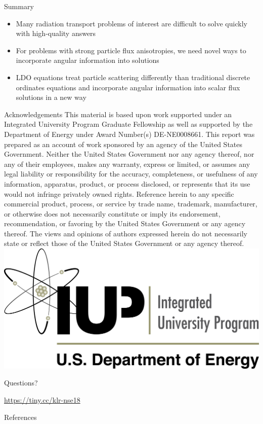 \documentclass{beamer}
\newcommand{\backupbegin}{
   \newcounter{framenumberappendix}
   \setcounter{framenumberappendix}{\value{framenumber}}
}
\newcommand{\backupend}{
   \addtocounter{framenumberappendix}{-\value{framenumber}}
   \addtocounter{framenumber}{\value{framenumberappendix}} 
}
\begin{document}
\begin{frame}{Summary}
%
\begin{itemize}
\item{Many radiation transport problems of interest are difficult to solve quickly with 
      high-quality answers}
\item{For problems with strong particle flux anisotropies, we need novel ways to incorporate
      angular information into solutions}
\item{LDO equations treat particle scattering differently than traditional discrete ordinates
      equations and incorporate angular information into scalar flux solutions in a new way}
\end{itemize}
%
\end{frame}

\begin{frame}{Acknowledgements}
\scriptsize
This material is based upon work supported under an Integrated
University Program Graduate Fellowship as well as supported by the Department 
of Energy under Award Number(s) DE-NE0008661. This report was prepared as an account 
of work sponsored by an agency of the United States Government. Neither the United 
States Government nor any agency thereof, nor any of their employees, makes any 
warranty, express or limited, or assumes any legal liability or responsibility for the 
accuracy, completeness, or usefulness of any information, apparatus, product, or
process disclosed, or represents that its use would not infringe privately owned
rights. Reference herein to any specific commercial product, process, or service by
trade name, trademark, manufacturer, or otherwise does not necessarily constitute or
imply its endorsement, recommendation, or favoring by the United States Government or
any agency thereof. The views and opinions of authors expressed herein do not 
necessarily state or reflect those of the United States Government or any agency 
thereof.
%
\centering
\includegraphics[width=\textwidth,natwidth=2539,natheight=1195]{img/DOE-IUP_Logo.png}
%
\end{frame}

\begin{frame}
  \huge{
  \begin{center}
  Questions?

  \vspace{\baselineskip}
  \url{https://tiny.cc/klr-nse18}
  \end{center}
  }
\end{frame}

\backupbegin
\begin{frame}{References}
\printbibliography
\end{frame}
\backupend
\end{document}
